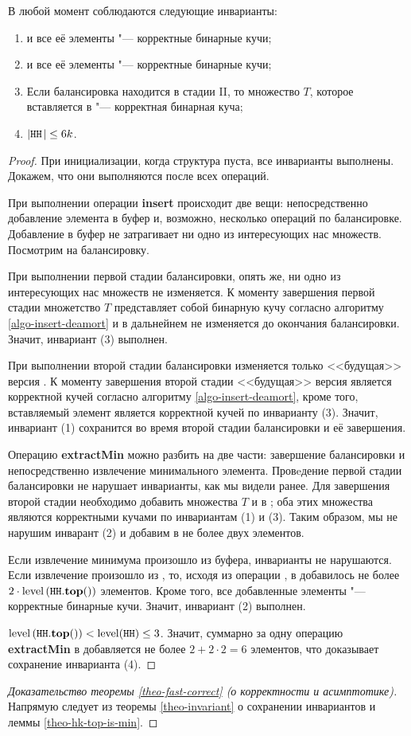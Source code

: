 \begin{theorem} \label{theo-invariant}
В любой момент соблюдаются следующие инварианты:
\begin{enumerate}
\item \MH и все её элементы "--- корректные бинарные кучи;
\item \HH и все её элементы "--- корректные бинарные кучи;
\item Если балансировка находится в стадии II, то множество $T$, которое
вставляется в \MH "--- корректная бинарная куча;
\item $|\texttt{HH}\;\!| \leq 6k$.
\end{enumerate}
\end{theorem}
\begin{proof}
При инициализации, когда структура пуста, все инварианты выполнены. Докажем,
что они выполняются после всех операций.

При выполнении операции \textbf{insert} происходит две вещи: непосредственно добавление
элемента в буфер и, возможно, несколько операций по балансировке. Добавление
в буфер не затрагивает ни одно из интересующих нас множеств. Посмотрим на балансировку.

При выполнении первой стадии балансировки, опять же, ни одно из интересующих
нас множеств не изменяется. К моменту завершения первой стадии множетство
$T$ представляет собой бинарную кучу согласно алгоритму \ref{algo-insert-deamort}
и в дальнейнем не изменяется до окончания балансировки. Значит, инвариант
(3) выполнен.

При выполнении второй стадии балансировки изменяется только <<будущая>>
версия \MH. К моменту завершения второй стадии <<будущая>> версия является
корректной кучей согласно алгоритму \ref{algo-insert-deamort}, кроме того,
вставляемый элемент является корректной кучей по инварианту (3). Значит,
инвариант (1) сохранится во время второй стадии балансировки и её завершения.

Операцию \textbf{extractMin} можно разбить на две части: завершение балансировки
и непосредственно извлечение минимального элемента. Провeдение первой стадии
балансировки не нарушает инварианты, как мы видели ранее. Для завершения
второй стадии необходимо добавить множества $T$ и \MH в \HH; оба этих множества
являются корректными кучами по инвариантам (1) и (3). Таким образом, мы не нарушим
инварант (2) и добавим в \HH не более двух элементов.

Если извлечение минимума произошло из буфера, инварианты не нарушаются. Если
извлечение произошло из \HH, то, исходя из операции \Yield, в \HH
добавилось не более $2 \cdot \operatorname{level} \left(\texttt{HH}.\mathbf{top}()\right)$ элементов. Кроме того,
все добавленные элементы "--- корректные бинарные кучи. Значит, инвариант (2)
выполнен.

$\operatorname{level} \left(\texttt{HH}.\mathbf{top}()\right) < \operatorname{level} (\texttt{HH}) \leq 3$. Значит, суммарно за одну операцию
\textbf{extractMin} в \HH добавляется не более $2 + 2\cdot 2 = 6$ элементов,
что доказывает сохранение инварианта (4).

\end{proof}

\begin{proof}[Доказательство теоремы \ref{theo-fast-correct} (о корректности и асимптотике)]
Напрямую следует из теоремы \ref{theo-invariant} о сохранении инвариантов и леммы
\ref{theo-hk-top-is-min}.
\end{proof}
